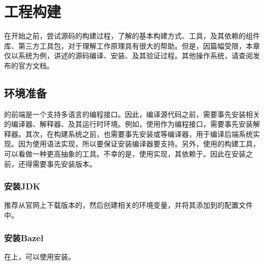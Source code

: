 \section{工程构建}

\begin{content}

在开始之前，尝试\tf{}源码的构建过程，了解\tf{}的基本构建方式、工具，及其依赖的组件库、第三方工具包，对于理解\tf{}工作原理具有很大的帮助。但是，因篇幅受限，本章仅以系统为例，讲述\tf{}的源码编译、安装、及其验证过程。其他操作系统，请查阅\tf{}发布的官方文档。

\subsection{环境准备}

的前端是一个支持多语言的编程接口。因此，编译源代码之前，需要事先安装相关的编译器、解释器、及其运行时环境。例如，使用作为编程接口，需要事先安装解释器。其次，在构建系统之前，也需要事先安装或等编译器，用于编译后端系统实现。因为使用语法实现，所以要保证安装编译器要支持。另外，使用的构建工具，可以看做一种更高抽象的工具。不幸的是，使用实现，其依赖于。因此在安装之前，还得需要事先安装版本。

\subsubsection{安装JDK}

推荐从官网上下载版本的，然后创建相关的环境变量，并将其添加到的配置文件中。

\begin{leftbar}
\end{leftbar}

\subsubsection{安装Bazel}

在上，可以使用安装。


\end{content}
